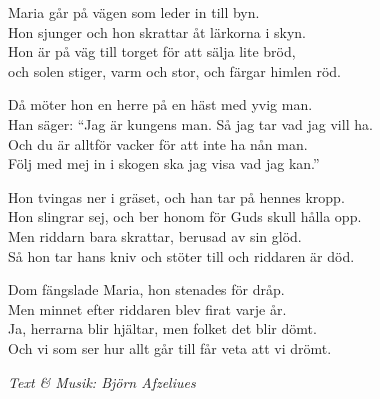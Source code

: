 \vspace{10pt}
Maria går på vägen som leder in till byn.\\
Hon sjunger och hon skrattar åt lärkorna i skyn.\\
Hon är på väg till torget för att sälja lite bröd,\\ 
och solen stiger, varm och stor, och färgar himlen röd.\par
\vspace{10pt}
Då möter hon en herre på en häst med yvig man.\\
Han säger: ``Jag är kungens man. Så jag tar vad jag vill ha.\\ 
Och du är alltför vacker för att inte ha nån man.\\
Följ med mej in i skogen ska jag visa vad jag kan.''\par
\vspace{10pt}
Hon tvingas ner i gräset, och han tar på hennes kropp.\\
Hon slingrar sej, och ber honom för Guds skull hålla opp.\\
Men riddarn bara skrattar, berusad av sin glöd.\\
Så hon tar hans kniv och stöter till och riddaren är död.\par
\vspace{10pt}
Dom fängslade Maria, hon stenades för dråp.\\
Men minnet efter riddaren blev firat varje år.\\
Ja, herrarna blir hjältar, men folket det blir dömt.\\
Och vi som ser hur allt går till får veta att vi drömt.\par
\vspace{10pt}
{\footnotesize\textit{Text \& Musik: Björn Afzeliues}}
